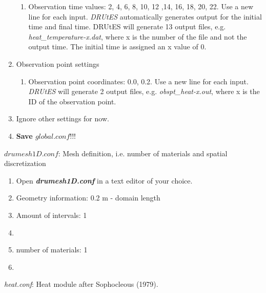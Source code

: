 \begin{enumerate}
\begin{enumerate}
\item Observation time values: 2, 4, 6, 8, 10, 12 ,14, 16, 18, 20, 22. Use a new line for each input. \textit{DRUtES} automatically generates output for the initial time and final time. DRUtES will generate 13 output files, e.g. \textit{heat\_temperature-x.dat}, where x is the number of the file and not the output time. The initial time is assigned an x value of 0. 
\end{enumerate}
\item Observation point settings \begin{enumerate}
\item Observation point coordinates: 0.0, 0.2. Use a new line for each input. \textit{DRUtES} will generate 2 output files, e.g. \textit{obspt\_heat-x.out}, where x is the ID of the observation point. 
\end{enumerate}
\item Ignore other settings for now. 
\item \textbf{Save $global.conf$}!!!
\end{enumerate}


$drumesh1D.conf$: Mesh definition, i.e. number of materials and spatial discretization
\begin{enumerate}
\item Open \textbf{\emph{drumesh1D.conf}} in a text editor of your choice. 
\item Geometry information: 0.2 m - domain length
\item Amount of intervals: 1
\item
{}
\item number of materials: 1
\item {}
\end{enumerate}

\emph{heat.conf}: Heat module after Sophocleous (1979). 



